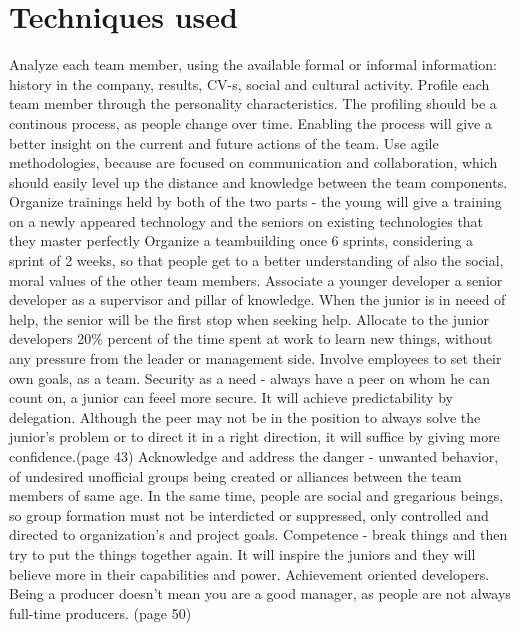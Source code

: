 \documentclass[conference]{IEEEtran}
\begin{document}
\section{Techniques used}
Analyze each team member, using the available formal or informal information: history in the company, results, CV-s, social and cultural activity. Profile each team member through the personality characteristics. The profiling should be a continous process, as people change over time. Enabling the process will give a better insight on the current and future actions of the team.
\newline\indent
Use agile methodologies, because are focused on communication and collaboration, which should easily level up the distance and knowledge between the team components.
\newline\indent
Organize trainings held by both of the two parts - the young will give a training on a newly appeared technology and the seniors on existing technologies that they master perfectly
\newline\indent
Organize a teambuilding once 6 sprints, considering a sprint of 2 weeks, so that people get to a better understanding of also the social, moral values of the other team members.
\newline\indent
Associate a younger developer a senior developer as a supervisor and pillar of knowledge. When the junior is in neeed of help, the senior will be the first stop when seeking help.
\newline\indent
Allocate to the junior developers 20\% percent of the time spent at work to learn new things, without any pressure from the leader or management side.
\newline\indent
Involve employees to set their own goals, as a team.
\newline\indent
Security as a need - always have a peer on whom he can count on, a junior can feeel more secure. It will achieve predictability by delegation. Although the peer may not be in the position to always solve the junior's problem or to direct it in a right direction, it will suffice by giving more confidence.(page 43)
\newline\indent
Acknowledge and address the danger - unwanted behavior, of undesired unofficial groups being created or alliances between the team members of same age. In the same time, people are social and gregarious beings, so group formation must not be interdicted or suppressed, only controlled and directed to organization's and project goals.
\newline\indent
Competence - break things and then try to put the things together again. It will inspire the juniors and they will believe more in their capabilities and power. Achievement oriented developers. Being a producer doesn't mean you are a good manager, as people are not always full-time producers. (page 50)
\end{document}
